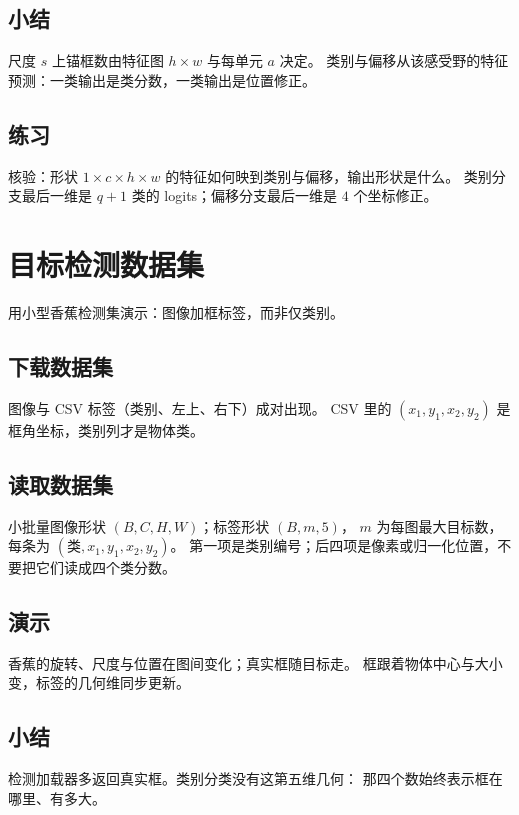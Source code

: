 \subsection{小结}

尺度 $s$ 上锚框数由特征图 $h\times w$ 与每单元 $a$ 决定。
类别与偏移从该感受野的特征预测：一类输出是类分数，一类输出是位置修正。

\subsection{练习}

核验：形状 $1\times c\times h\times w$ 的特征如何映到类别与偏移，输出形状是什么。
类别分支最后一维是 $q+1$ 类的 logits；偏移分支最后一维是 $4$ 个坐标修正。

\section{目标检测数据集}

用小型香蕉检测集演示：图像加框标签，而非仅类别。

\subsection{下载数据集}

图像与 CSV 标签（类别、左上、右下）成对出现。
CSV 里的 $(x_1,y_1,x_2,y_2)$ 是框角坐标，类别列才是物体类。

\subsection{读取数据集}

小批量图像形状 $(B,C,H,W)$；标签形状 $(B,m,5)$，
$m$ 为每图最大目标数，每条为 $(\text{类},x_1,y_1,x_2,y_2)$。
第一项是类别编号；后四项是像素或归一化位置，不要把它们读成四个类分数。

\subsection{演示}

香蕉的旋转、尺度与位置在图间变化；真实框随目标走。
框跟着物体中心与大小变，标签的几何维同步更新。

\subsection{小结}

检测加载器多返回真实框。类别分类没有这第五维几何：
那四个数始终表示框在哪里、有多大。

